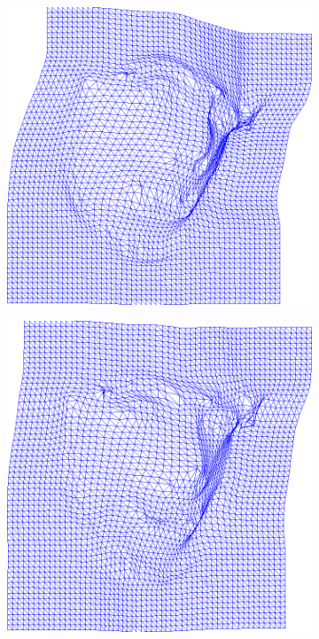 \begin{figure}[h]
\begin{subfigure}[b]{0.15\textwidth}
    \end{subfigure}
    \hfill
    \begin{subfigure}[b]{0.15\textwidth}
            \includegraphics[width=\textwidth]{resources/Fig_Flows/4}
    \end{subfigure}
    \hfill
    \begin{subfigure}[b]{0.15\textwidth}
            \includegraphics[width=\textwidth]{resources/Fig_Flows/5}

\end{subfigure}
\end{figure}

